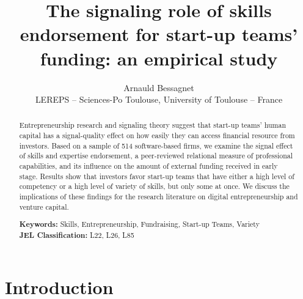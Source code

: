 \documentclass[12pt]{article}
\begin{document}
\title{The signaling role of skills endorsement for start-up teams' funding: an empirical study}
\date{\vspace{-3ex}}
\author{Arnauld Bessagnet \\ \footnotesize{LEREPS – Sciences-Po Toulouse, University of Toulouse – France} \\}

\maketitle \vspace{-1,5em}

\begin{abstract}
\noindent
Entrepreneurship research and signaling theory suggest that start-up teams' human capital has a signal-quality effect on how easily they can access financial resource from investors. Based on a sample of 514 software-based firms, we examine the signal effect of skills and expertise endorsement, a peer-reviewed relational measure of professional capabilities, and its influence on the amount of external funding received in early stage. Results show that investors favor start-up teams that have either a high level of competency or a high level of variety of skills, but only some at once. We discuss the implications of these findings for the research literature on digital entrepreneurship and venture capital. \newline

\begin{obeylines}
\noindent \footnotesize{}{\textbf{Keywords:} Skills, Entrepreneurship, Fundraising, Start-up Teams, Variety}
\noindent \footnotesize{\textbf{JEL Classification:} L22, L26, L85}
\end{obeylines}

\end{abstract}

\clearpage
\section{Introduction}
\end{document}
